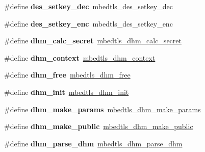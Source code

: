 \begin{DoxyCompactItemize}
\#define {\bfseries des\+\_\+setkey\+\_\+dec}~mbedtls\+\_\+des\+\_\+setkey\+\_\+dec
\item 
\mbox{\label{compat-1_83_8h_ac1391279226778f0fcf83ecb958257d3}} 
\#define {\bfseries des\+\_\+setkey\+\_\+enc}~mbedtls\+\_\+des\+\_\+setkey\+\_\+enc
\item 
\mbox{\label{compat-1_83_8h_a6b426313d39c27208bd82990aad4d8bf}} 
\#define {\bfseries dhm\+\_\+calc\+\_\+secret}~\mbox{\hyperlink{dhm_8h_ac3985de01420d018ed91daec9e7d7969}{mbedtls\+\_\+dhm\+\_\+calc\+\_\+secret}}
\item 
\mbox{\label{compat-1_83_8h_affdd62bb207fc5f12c72e8bef0c11d27}} 
\#define {\bfseries dhm\+\_\+context}~\mbox{\hyperlink{structmbedtls__dhm__context}{mbedtls\+\_\+dhm\+\_\+context}}
\item 
\mbox{\label{compat-1_83_8h_adaf6ae910380f236504ef1f1899bceb4}} 
\#define {\bfseries dhm\+\_\+free}~\mbox{\hyperlink{dhm_8h_a092d039d88063538f67aaf9cf45d1d30}{mbedtls\+\_\+dhm\+\_\+free}}
\item 
\mbox{\label{compat-1_83_8h_af1b79f9d221f0c1ce4f94b149e265c22}} 
\#define {\bfseries dhm\+\_\+init}~\mbox{\hyperlink{dhm_8h_abf5ead59678b6ca8892b3c052452f5ac}{mbedtls\+\_\+dhm\+\_\+init}}
\item 
\mbox{\label{compat-1_83_8h_a02cdaa7aa3d9f6bbfebd5aa49350a48b}} 
\#define {\bfseries dhm\+\_\+make\+\_\+params}~\mbox{\hyperlink{dhm_8h_ad674b35720bf6c3f3ba66355cab5e449}{mbedtls\+\_\+dhm\+\_\+make\+\_\+params}}
\item 
\mbox{\label{compat-1_83_8h_a2163e0b1d8f3b0979ade53113771cec9}} 
\#define {\bfseries dhm\+\_\+make\+\_\+public}~\mbox{\hyperlink{dhm_8h_af49bee438130355e24540f7565e7465f}{mbedtls\+\_\+dhm\+\_\+make\+\_\+public}}
\item 
\mbox{\label{compat-1_83_8h_a076784dc30bee54a6c8f2489a07cbfc6}} 
\#define {\bfseries dhm\+\_\+parse\+\_\+dhm}~\mbox{\hyperlink{group__x509__module_gae1bf556398cac1761aa2041908e9f619}{mbedtls\+\_\+dhm\+\_\+parse\+\_\+dhm}}
\item 
\mbox{\label{compat-1_83_8h_aed92a3069ef8bde2a485720373fc297b}} 

\end{DoxyCompactItemize}
